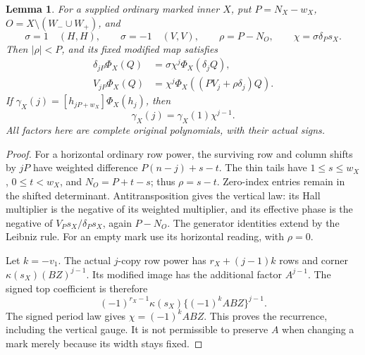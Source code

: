 \documentclass[11pt,a4paper]{amsart}
\numberwithin{equation}{section}
\theoremstyle{plain}
\newtheorem{lemma}[theorem]{Lemma}
\theoremstyle{definition}
\begin{document}
\begin{lemma}\label{lem:oo-covariance}
For a supplied ordinary marked inner \(X\), put \(P=N_X-w_X\), \(O=X\setminus(W_-\cup W_+)\), and
\[
 \sigma=1\quad(H,H),\qquad \sigma=-1\quad(V,V),\qquad
 \rho=P-N_O,\qquad \chi=\sigma\delta_Ps_X.
\]
Then \(|\rho|<P\), and its fixed modified map satisfies
\begin{align*}
 \delta_{jP}\Phi_X(Q)&=\sigma\chi^j\Phi_X(\delta_jQ),\\
 V_{jP}\Phi_X(Q)&=\chi^j\Phi_X((PV_j+\rho\delta_j)Q).
\end{align*}
If \(\gamma_X(j)=[h_{jP+w_X}]\Phi_X(h_j)\), then
\[
 \gamma_X(j)=\gamma_X(1)\chi^{j-1}.
\]
All factors here are complete original polynomials, with their actual signs.
\end{lemma}
\begin{proof}
For a horizontal ordinary row power, the surviving row and column shifts by \(jP\) have weighted difference \(P(n-j)+s-t\).  The thin tails have \(1\le s\le w_X\), \(0\le t<w_X\), and \(N_O=P+t-s\); thus \(\rho=s-t\).  Zero-index entries remain in the shifted determinant.  Antitransposition gives the vertical law: its Hall multiplier is the negative of its weighted multiplier, and its effective phase is the negative of \(V_Ps_X/\delta_Ps_X\), again \(P-N_O\).  The generator identities extend by the Leibniz rule.  For an empty mark use its horizontal reading, with \(\rho=0\).

Let \(k=-v_1\).  The actual \(j\)-copy row power has \(r_X+(j-1)k\) rows and corner \(\kappa(s_X)(BZ)^{j-1}\).  Its modified image has the additional factor \(A^{j-1}\).  The signed top coefficient is therefore
\[
 (-1)^{r_X-1}\kappa(s_X)\{(-1)^kABZ\}^{j-1}.
\]
The signed period law gives \(\chi=(-1)^kABZ\).  This proves the recurrence, including the vertical gauge.  It is not permissible to preserve \(A\) when changing a mark merely because its width stays fixed.
\end{proof}
\end{document}
